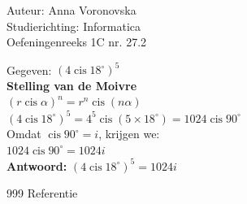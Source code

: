 \documentclass[a4paper]{article}
\begin{document}
\noindent \large Auteur: Anna Voronovska \\
\noindent \large Studierichting: Informatica \\
\noindent \large Oefeningenreeks 1C nr. 27.2 \\

\bigskip 

\normalsize
 Gegeven:  $ (4 \operatorname{cis} 18^\circ)^5 $  \\

\textbf{Stelling van de Moivre}   \\
  
$ (r \operatorname{cis} \alpha)^n = r^n \operatorname{cis} (n\alpha) $  \\

$ (4 \operatorname{cis} 18^\circ)^5 = 4^5 \operatorname{cis} (5 \times 18^\circ) = 1024 \operatorname{cis} 90^\circ  $    \\

Omdat $ \operatorname{cis} 90^\circ = i $, krijgen we:  \\

$ 1024 \operatorname{cis} 90^\circ = 1024i $   \\


\textbf{Antwoord:}  $ (4 \operatorname{cis} 18^\circ)^5 = 1024i $



\begin{thebibliography}{999}
 Referentie
\end{thebibliography}
\end{document}

